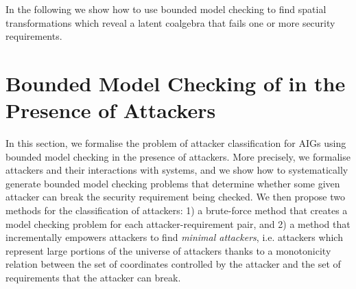 In the following we show how to use bounded model checking to find spatial transformations which reveal a latent coalgebra that fails one or more security requirements. %

% 




\section{Bounded Model Checking of in the Presence of Attackers}
\label{sec:bmc}
In this section, we %
formalise the problem of attacker classification for AIGs using bounded model checking in the presence of attackers. More precisely, %
we formalise attackers and their interactions with systems, and we show how to systematically generate bounded model checking problems that determine whether some given attacker can break the security requirement being checked. We then propose two methods for the classification of attackers: 1) a brute-force method that creates a model checking problem for each attacker-requirement pair, and 2) a method that incrementally empowers attackers to find \emph{minimal attackers}, i.e. attackers which represent large portions of the universe of attackers thanks to a monotonicity relation between the set of coordinates controlled by the attacker and the set of requirements that the attacker can break. %

